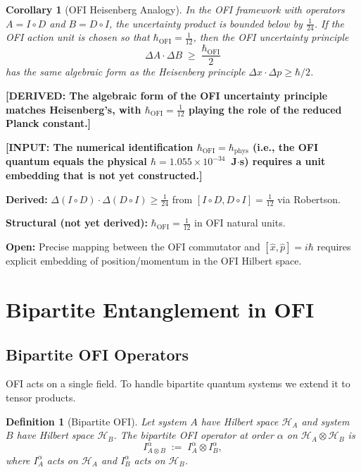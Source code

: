 \documentclass[12pt]{article}
\newtheorem{corollary}[theorem]{Corollary}
\newtheorem{definition}[theorem]{Definition}
\theoremstyle{definition}
\newcommand{\OFI}{\mathrm{OFI}}
\newcommand{\DERIVED}[1]{\textcolor{derivedcolor}{\textbf{[DERIVED: #1]}}}
\newcommand{\INPUT}[1]{\textcolor{inputcolor}{\textbf{[INPUT: #1]}}}
\begin{document}
\begin{corollary}[OFI Heisenberg Analogy]
\label{cor:heisenberg-ofi}
In the OFI framework with operators $A = I\circ D$ and $B = D\circ I$,
the uncertainty product is bounded below by $\tfrac{1}{24}$.  If the
OFI action unit is chosen so that $\hbar_{\OFI} = \tfrac{1}{12}$,
then the OFI uncertainty principle
\[
  \Delta A \cdot \Delta B \;\geq\; \frac{\hbar_{\OFI}}{2}
\]
has the same algebraic form as the Heisenberg principle
$\Delta x \cdot \Delta p \geq \hbar/2$.
\end{corollary}

\DERIVED{The algebraic form of the OFI uncertainty principle matches
Heisenberg's, with $\hbar_{\OFI} = \tfrac{1}{12}$ playing the role of
the reduced Planck constant.}

\INPUT{The numerical identification $\hbar_{\OFI} = \hbar_{\mathrm{phys}}$
(i.e., the OFI quantum equals the physical $\hbar = 1.055\times 10^{-34}$~J$\cdot$s)
requires a unit embedding that is not yet constructed.}

\begin{tcolorbox}[resultbox, title={Summary of Section~\ref{sec:uncertainty}}]
\textbf{Derived:}
$\Delta(I\circ D)\cdot\Delta(D\circ I) \geq \tfrac{1}{24}$
from $[I\circ D, D\circ I] = \tfrac{1}{12}$ via Robertson.

\textbf{Structural (not yet derived):}
$\hbar_{\OFI} = \tfrac{1}{12}$ in OFI natural units.

\textbf{Open:}
Precise mapping between the OFI commutator and $[\hat{x},\hat{p}]=i\hbar$
requires explicit embedding of position/momentum in the OFI Hilbert space.
\end{tcolorbox}

\section{Bipartite Entanglement in OFI}
\label{sec:entanglement}

\subsection{Bipartite OFI Operators}

OFI acts on a single field. To handle bipartite quantum systems we
extend it to tensor products.

\begin{definition}[Bipartite OFI]
\label{def:bipartite}
Let system $A$ have Hilbert space $\mathcal{H}_A$ and system $B$ have
Hilbert space $\mathcal{H}_B$.  The bipartite OFI operator at order
$\alpha$ on $\mathcal{H}_A \otimes \mathcal{H}_B$ is
\begin{equation}
  I^\alpha_{A\otimes B}
  \;:=\;
  I^\alpha_A \otimes I^\alpha_B,
  \label{eq:bipartite-ofi}
\end{equation}
where $I^\alpha_A$ acts on $\mathcal{H}_A$ and $I^\alpha_B$ acts on
$\mathcal{H}_B$.
\end{definition}
\end{document}
